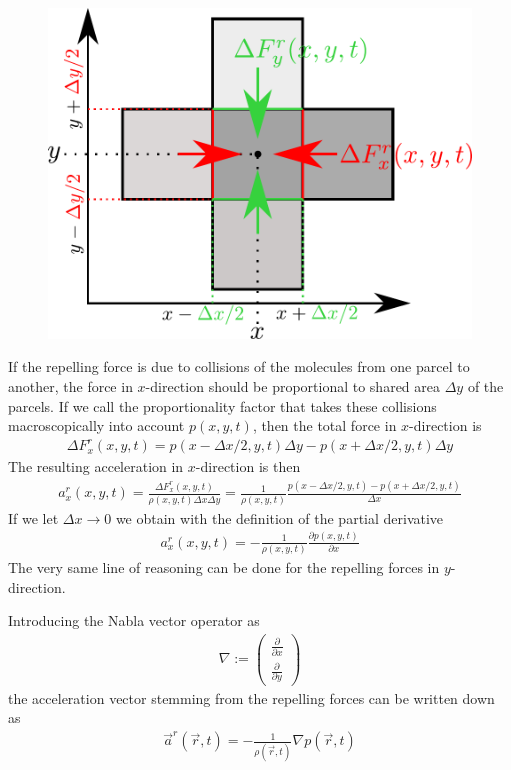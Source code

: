 \documentclass[10pt,a4paper]{article}
\begin{document}
\begin{figure}[H]
\begin{center}
\includegraphics[scale=0.7]{repelling_forces.pdf}
\end{center}
\end{figure}
%
If the repelling force is due to collisions of the molecules from one parcel to another, the force in $x$-direction should be proportional to shared area $\Delta y$ of the parcels.
%
If we call the proportionality factor that takes these collisions macroscopically into account $p(x,y,t)$, then the total force in $x$-direction is
%
\begin{align}
\Delta F^r_x(x,y,t) = p(x-\Delta x/2, y, t) \Delta y - p(x+\Delta x/2, y, t)\Delta y
\end{align}
%
The resulting acceleration in $x$-direction is then
%
\begin{align}
a_x^r(x,y,t) = \frac{\Delta F^r_x(x,y,t)}{\rho(x,y,t) \Delta x \Delta y} = \frac{1}{\rho(x,y,t)} \frac{ p(x-\Delta x/2, y, t)  - p(x+\Delta x/2, y, t)}{\Delta x}
\end{align}
%
If we let $\Delta x \to 0$ we obtain with the definition of the partial derivative
%
\begin{align}
a^r_x(x,y,t) =  -\frac{1}{\rho(x,y,t)} \frac{ \partial p(x, y, t)}{ \partial x}
\end{align}
%
The very same line of reasoning can be done for the repelling forces in $y$-direction.

Introducing the Nabla vector operator as
%
\begin{align}
\nabla := \begin{pmatrix}
\frac{\partial}{\partial x} \\
\frac{\partial}{\partial y}
\end{pmatrix}
\end{align}
%
the acceleration vector stemming from the repelling forces can be written down as
%
\begin{align}
\boxed{
\vec{a}^r(\vec{r},t) =  -\frac{1}{\rho(\vec{r},t)} \nabla p(\vec{r}, t)
}
\end{align}
%
\end{document}
